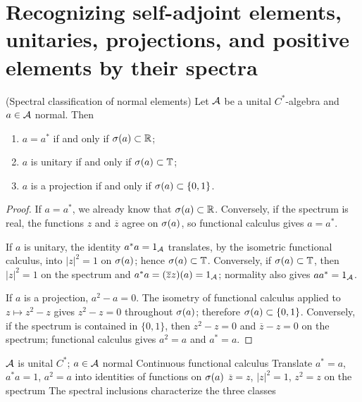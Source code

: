 \section{Recognizing self-adjoint elements, unitaries, projections, and positive elements by their spectra}

\begin{cthproposicion}{(Spectral classification of normal elements)}
Let $\mathcal A$ be a unital $C^*$-algebra and $a\in\mathcal A$ normal. Then
\begin{enumerate}[label=(\roman*)]
\item $a=a^*$ if and only if $\sigma(a)\subset\mathbb R$;
\item $a$ is unitary if and only if $\sigma(a)\subset\mathbb T$;
\item $a$ is a projection if and only if $\sigma(a)\subset\{0,1\}$.
\end{enumerate}
\end{cthproposicion}

\begin{proof}[Proof]
If $a=a^*$, we already know that $\sigma(a)\subset\mathbb R$. Conversely,
if the spectrum is real, the functions $z$ and $\overline z$ agree on
$\sigma(a)$, so functional calculus gives $a=a^*$.

If $a$ is unitary, the identity $a^*a=1_\mathcal A$ translates, by the isometric
functional calculus, into $|z|^2=1$ on $\sigma(a)$; hence
$\sigma(a)\subset\mathbb T$. Conversely, if
$\sigma(a)\subset\mathbb T$, then $|z|^2=1$ on the spectrum and
$a^*a=(\overline z z)(a)=1_\mathcal A$; normality also gives $aa^*=1_\mathcal A$.

If $a$ is a projection, $a^2-a=0$. The isometry of functional calculus
applied to $z\mapsto z^2-z$ gives $z^2-z=0$ throughout $\sigma(a)$;
therefore $\sigma(a)\subset\{0,1\}$. Conversely, if the spectrum is
contained in $\{0,1\}$, then $z^2-z=0$ and $\overline z-z=0$ on the
spectrum; functional calculus gives $a^2=a$ and $a^*=a$.
\end{proof}

\proofdiagrambranch
{$\mathcal A$ is unital $C^*$; $a\in\mathcal A$ normal}
{Continuous functional calculus}
{Translate $a^*=a$, $a^*a=1$, $a^2=a$ into identities of functions on $\sigma(a)$}
{$\overline z=z$, $|z|^2=1$, $z^2=z$ on the spectrum}
{The spectral inclusions characterize the three classes}

